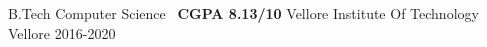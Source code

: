 \begin{cventries}
  \cventry
    { B.Tech Computer Science \textbar\ \textbf{CGPA 8.13/10} }
    { Vellore Institute Of Technology }
    { Vellore }
    { 2016-2020 }
    {}
\end{cventries}
